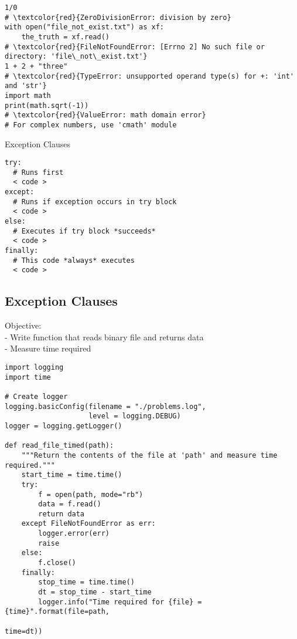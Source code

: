 \documentclass{beamer}
\begin{document}
\begin{frame}[fragile]{}
\begin{verbatim}
1/0
# \textcolor{red}{ZeroDivisionError: division by zero}
with open("file_not_exist.txt") as xf:
    the_truth = xf.read()
# \textcolor{red}{FileNotFoundError: [Errno 2] No such file or directory: 'file\_not\_exist.txt'}
1 + 2 + "three"
# \textcolor{red}{TypeError: unsupported operand type(s) for +: 'int' and 'str'}
import math
print(math.sqrt(-1))
# \textcolor{red}{ValueError: math domain error}
# For complex numbers, use 'cmath' module
\end{verbatim}
\scriptsize{Exception Clauses}
\begin{verbatim}
try:
  # Runs first
  < code >
except:
  # Runs if exception occurs in try block
  < code >
else:
  # Executes if try block *succeeds*
  < code >
finally:
  # This code *always* executes
  < code >
\end{verbatim}
\end{frame}

\subsection{Exception Clauses}

\begin{frame}[fragile]{}
Objective:\\
- Write function that reads binary file and returns data\\
- Measure time required
\begin{verbatim}
import logging
import time

# Create logger
logging.basicConfig(filename = "./problems.log",
                    level = logging.DEBUG)
logger = logging.getLogger()

def read_file_timed(path):
    """Return the contents of the file at 'path' and measure time required."""
    start_time = time.time()
    try:
        f = open(path, mode="rb")
        data = f.read()
        return data
    except FileNotFoundError as err:
        logger.error(err)
        raise
    else:
        f.close()
    finally:
        stop_time = time.time()
        dt = stop_time - start_time
        logger.info("Time required for {file} = {time}".format(file=path,
                                                              time=dt))
\end{verbatim}
\end{frame}
\end{document}
